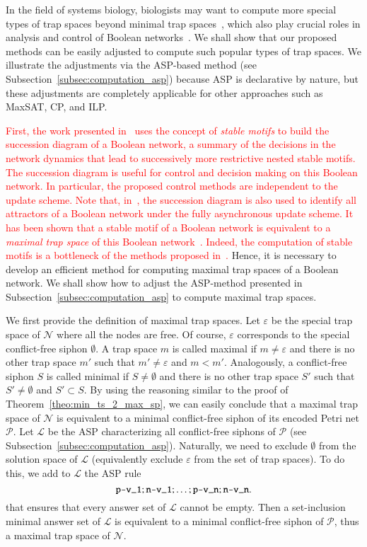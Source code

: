 \documentclass[preprint,12pt]{elsarticle}
\newcommand{\change}[1]{\textcolor{red}{#1}}
\begin{document}
In the field of systems biology, biologists may want to compute more special types of trap spaces beyond minimal trap spaces~\cite{klarner2017pyboolnet}, which also play crucial roles in analysis and control of Boolean networks~\cite{cifuentes2020control,Rozum2021}.
We shall show that our proposed methods can be easily adjusted to compute such popular types of trap spaces.
We illustrate the adjustments via the ASP-based method (see Subsection~\ref{subsec:computation_asp}) because ASP is declarative by nature, but these adjustments are completely applicable for other approaches such as MaxSAT, CP, and ILP\@.

\change{First, the work presented in~\cite{Rozum2021} uses the concept of \emph{stable motifs} to build the succession diagram of a Boolean network, a summary of the decisions in the network dynamics that lead to successively more restrictive nested stable motifs.
The succession diagram is useful for control and decision making on this Boolean network.
In particular, the proposed control methods are independent to the update scheme.
Note that, in~\cite{Rozum2021}, the succession diagram is also used to identify all attractors of a Boolean network under the fully asynchronous update scheme.
It has been shown that a stable motif of a Boolean network is equivalent to a \emph{maximal trap space} of this Boolean network~\cite{Rozum2021}.
Indeed, the computation of stable motifs is a bottleneck of the methods proposed in~\cite{Rozum2021}.}
Hence, it is necessary to develop an efficient method for computing maximal trap spaces of a Boolean network.
We shall show how to adjust the ASP-method presented in Subsection~\ref{subsec:computation_asp} to compute maximal trap spaces.

We first provide the definition of maximal trap spaces.
Let \(\varepsilon\) be the special trap space of \(\mathcal{N}\) where all the nodes are free.
Of course, \(\varepsilon\) corresponds to the special conflict-free siphon \(\emptyset\).
A trap space \(m\) is called maximal if \(m \neq \varepsilon\) and there is no other trap space \(m'\) such that \(m' \neq \varepsilon\) and \(m < m'\).
Analogously, a conflict-free siphon \(S\) is called minimal if \(S \neq \emptyset\) and there is no other trap space \(S'\) such that \(S' \neq \emptyset\) and \(S' \subset S\).
By using the reasoning similar to the proof of Theorem~\ref{theo:min_ts_2_max_sp}, we can easily conclude that a maximal trap space of \(\mathcal{N}\) is equivalent to a minimal conflict-free siphon of its encoded Petri net \(\mathcal{P}\).
Let \(\mathcal{L}\) be the ASP characterizing all conflict-free siphons of \(\mathcal{P}\) (see Subsection~\ref{subsec:computation_asp}).
Naturally, we need to exclude \(\emptyset\) from the solution space of \(\mathcal{L}\) (equivalently exclude \(\varepsilon\) from the set of trap spaces).
To do this, we add to \(\mathcal{L}\) the ASP rule
\[
  \verb|p-v_1| ; \verb|n-v_1| ; \dots ; \verb|p-v_n| ; \verb|n-v_n|.
\]
that ensures that every answer set of \(\mathcal{L}\) cannot be empty.
Then a set-inclusion minimal answer set of \(\mathcal{L}\) is equivalent to a minimal conflict-free siphon of \(\mathcal{P}\), thus a maximal trap space of \(\mathcal{N}\).
\end{document}
